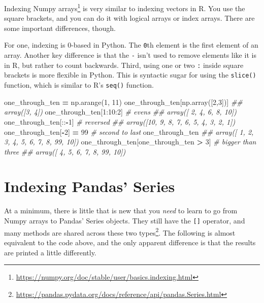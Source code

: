 \documentclass[
  12pt,
  krantz2]{krantz}
\makeatletter
\newenvironment{Shaded}{\begin{snugshade}}{\end{snugshade}}
\newcommand{\CommentTok}[1]{\textcolor[rgb]{0.37,0.37,0.37}{\textit{#1}}}
\newcommand{\DecValTok}[1]{\textcolor[rgb]{0.06,0.06,0.06}{#1}}
\newcommand{\NormalTok}[1]{#1}
\newcommand{\OperatorTok}[1]{\textcolor[rgb]{0.43,0.43,0.43}{\textbf{#1}}}
\renewcommand{\href}[2]{#2\footnote{\url{#1}}}
\newenvironment{kframe}{%
\medskip{}
\setlength{\fboxsep}{.8em}
 \def\at@end@of@kframe{}%
 \ifinner\ifhmode%
  \def\at@end@of@kframe{\end{minipage}}%
  \begin{minipage}{\columnwidth}%
 \fi\fi%
 \def\FrameCommand##1{\hskip\@totalleftmargin \hskip-\fboxsep
 \colorbox{shadecolor}{##1}\hskip-\fboxsep
     \hskip-\linewidth \hskip-\@totalleftmargin \hskip\columnwidth}%
 \MakeFramed {\advance\hsize-\width
   \@totalleftmargin\z@ \linewidth\hsize
   \@setminipage}}%
 {\par\unskip\endMakeFramed%
 \at@end@of@kframe}
\renewenvironment{Shaded}{\begin{kframe}}{\end{kframe}}
\makeatother
\begin{document}
\href{https://numpy.org/doc/stable/user/basics.indexing.html}{Indexing Numpy arrays} is very similar to indexing vectors in R. You use the square brackets, and you can do it with logical arrays or index arrays. There are some important differences, though.

For one, indexing is 0-based in Python. The \texttt{0}th element is the first element of an array. Another key difference is that the \texttt{-} isn't used to remove elements like it is in R, but rather to count backwards. Third, using one or two \texttt{:} inside square brackets is more flexible in Python. This is syntactic sugar for using the \texttt{slice()} function, which is similar to R's \texttt{seq()} function.

\begin{Shaded}
\begin{Highlighting}[]
\NormalTok{one\_through\_ten }\OperatorTok{=}\NormalTok{ np.arange(}\DecValTok{1}\NormalTok{, }\DecValTok{11}\NormalTok{)}
\NormalTok{one\_through\_ten[np.array([}\DecValTok{2}\NormalTok{,}\DecValTok{3}\NormalTok{])]}
\CommentTok{\#\# array([3, 4])}
\NormalTok{one\_through\_ten[}\DecValTok{1}\NormalTok{:}\DecValTok{10}\NormalTok{:}\DecValTok{2}\NormalTok{] }\CommentTok{\# evens}
\CommentTok{\#\# array([ 2,  4,  6,  8, 10])}
\NormalTok{one\_through\_ten[::}\OperatorTok{{-}}\DecValTok{1}\NormalTok{] }\CommentTok{\# reversed}
\CommentTok{\#\# array([10,  9,  8,  7,  6,  5,  4,  3,  2,  1])}
\NormalTok{one\_through\_ten[}\OperatorTok{{-}}\DecValTok{2}\NormalTok{] }\OperatorTok{=} \DecValTok{99} \CommentTok{\# second to last}
\NormalTok{one\_through\_ten}
\CommentTok{\#\# array([ 1,  2,  3,  4,  5,  6,  7,  8, 99, 10])}
\NormalTok{one\_through\_ten[one\_through\_ten }\OperatorTok{\textgreater{}} \DecValTok{3}\NormalTok{] }\CommentTok{\# bigger than three}
\CommentTok{\#\# array([ 4,  5,  6,  7,  8, 99, 10])}
\end{Highlighting}
\end{Shaded}

\hypertarget{indexing-pandas-series}{%
\section{Indexing Pandas' Series}\label{indexing-pandas-series}}

At a minimum, there is little that is new that you \emph{need} to learn to go from Numpy arrays to Pandas' Series objects. They still have the \texttt{{[}{]}} operator, and \href{https://pandas.pydata.org/docs/reference/api/pandas.Series.html}{many methods are shared across these two types}. The following is almost equivalent to the code above, and the only apparent difference is that the results are printed a little differently.
\end{document}
